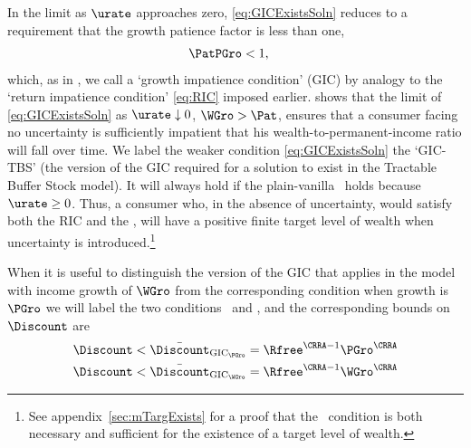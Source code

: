 \documentclass{\handout}
\begin{document}
In the limit as $\urate$ approaches zero, \eqref{eq:GICExistsSoln} reduces to a requirement that the growth patience factor is less than one,
\begin{equation}\begin{gathered}\begin{aligned}
  \PatPGro & <  1 \label{eq:GICPGro}
,\end{aligned}\end{gathered}\end{equation}
which, as in ,  we call a `growth impatience condition' (GIC) by analogy to the `return impatience condition' \eqref{eq:RIC} imposed earlier.   shows that the limit of \eqref{eq:GICExistsSoln} as $\urate \downarrow 0$, $\WGro > \Pat$, ensures that a consumer facing no uncertainty is sufficiently impatient that his wealth-to-permanent-income ratio will fall over time.  
We label the weaker condition \eqref{eq:GICExistsSoln} the `GIC-TBS' (the version of the GIC required for a solution to exist in the Tractable Buffer Stock model).  It will always hold if the plain-vanilla \GICWGro~holds because $\urate \geq 0$.  Thus, a consumer who, in the absence of uncertainty, would satisfy both the RIC and the \GICWGro, will have a positive finite target level of wealth when uncertainty is introduced.\footnote{See appendix~\ref{sec:mTargExists} for a proof that the \GICPGro~condition is both necessary and sufficient for the existence of a target level of wealth.}

When it is useful to distinguish the version of the GIC that applies in the model with income growth of $\WGro$ from the corresponding condition when growth is $\PGro$ we will label the two conditions \GICPGro~and \GICWGro, and the corresponding bounds on $\Discount$ are 
\begin{equation}\begin{gathered}\begin{aligned}
   \Discount < \DiscountMaxGICPGro & =  \Rfree^{\CRRA-1}\PGro^{\CRRA}
\\ \Discount < \DiscountMaxGICWGro & =  \Rfree^{\CRRA-1}\WGro^{\CRRA}
\end{aligned}\end{gathered}\end{equation}
\end{document}
